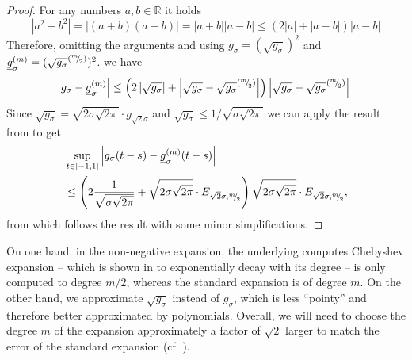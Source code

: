 \begin{proof}
    For any numbers $a, b \in \mathbb{R}$ it holds
    \begin{equation}
    | a^2 - b^2 | = | (a + b)(a - b) | = | a + b | | a - b | \leq (2 | a | + | a - b |)  | a - b |
    \end{equation}
    Therefore, omitting the arguments and using $g_{\sigma} = (\sqrt{g_{\sigma}})^2$ and $\underline{g}_{\sigma}^{(m)} = (\sqrt{g_{\sigma}}^{({}^{m}{\mskip -5mu/\mskip -3mu}_{2})})^2$.
    we have
    \begin{equation}
        \left| g_{\sigma} - \underline{g}_{\sigma}^{(m)} \right| \leq \left( 2 \left| \sqrt{g_{\sigma}} \right| + \left| \sqrt{g_{\sigma}} - \sqrt{g_{\sigma}}^{({}^{m}{\mskip -5mu/\mskip -3mu}_{2})} \right| \right) \left| \sqrt{g_{\sigma}} - \sqrt{g_{\sigma}}^{({}^{m}{\mskip -5mu/\mskip -3mu}_{2})} \right|.
    \end{equation}
    Since $\sqrt{g_{\sigma}} = \sqrt{2 \sigma \sqrt{2 \pi}} \cdot g_{\sqrt{2}\sigma}$ and $\sqrt{g_{\sigma}} \leq 1/\sqrt{\sigma \sqrt{2 \pi}}$ we can apply the result from  to get
    \begin{align}
        &\sup_{t \in [-1, 1]} \left| g_{\sigma}(t - s) - \underline{g}_{\sigma}^{(m)}(t - s) \right| \notag \\
        &\leq \left( 2 \frac{1}{\sqrt{ \sigma \sqrt{2\pi}}} + \sqrt{2 \sigma \sqrt{2 \pi}} \cdot E_{\sqrt{2}\sigma, {}^{m}{\mskip -5mu/\mskip -3mu}_{2}}\right)\sqrt{2 \sigma \sqrt{2 \pi}} \cdot E_{\sqrt{2}\sigma, {}^{m}{\mskip -5mu/\mskip -3mu}_{2}},
    \end{align}
    from which follows the result with some minor simplifications.

\end{proof}

On one hand, in the non-negative expansion, the underlying computes Chebyshev expansion -- which is shown in  to exponentially decay with its degree -- is only computed to degree $m/2$, whereas the standard expansion is of degree $m$. On the other hand, we approximate $\sqrt{g_{\sigma}}$ instead of $g_{\sigma}$, which is less \enquote{pointy} and therefore better approximated by polynomials. Overall, we will need to choose the degree $m$ of the expansion approximately a factor of $\sqrt{2}$ larger to match the error of the standard expansion (cf. ).

